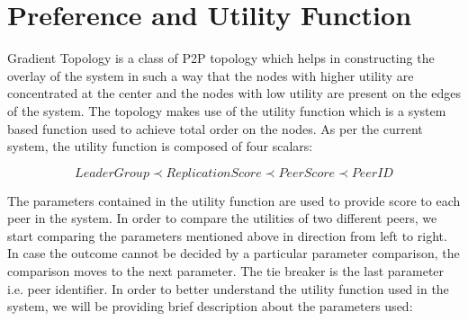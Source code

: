 \documentclass[a4paper,11pt]{kth-mag}
\begin{document}
\section{Preference and Utility Function}
\label{sec:utility}

Gradient Topology is a class of P2P topology which helps in constructing the overlay of the system in such a way that the nodes with higher utility are concentrated at the center and the nodes with low utility are present on the edges of the system. The topology makes use of the utility function which is a system based function used to achieve total order on the nodes. As per the current system, the utility function is composed of four scalars:

\small
\begin{equation*}
    LeaderGroup \prec ReplicationScore \prec PeerScore \prec PeerID
\end{equation*}
\normalsize

The parameters contained in the utility function are used to provide score to each peer in the system. In order to compare the utilities of two different peers, we start comparing the parameters mentioned above in direction from left to right. In case the outcome cannot be decided by a particular parameter comparison, the comparison moves to the next parameter. The tie breaker is the last parameter i.e. peer identifier. In order to better understand the utility function used in the system, we will be providing brief description about the parameters used:
\end{document}
